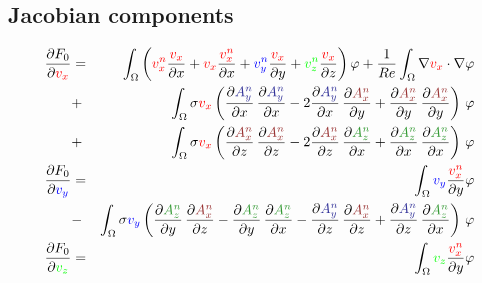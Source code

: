 \documentclass[smallextended]{svjour3}       %
\begin{document}
		\subsection{Jacobian components}
		\begin{eqnarray}
		\frac{\partial F_0}{\partial \textcolor{red}{v_x}} & = &
		\int_{\Omega} \left(\textcolor{red}{v_x^n} \frac{\textcolor{red}{v_x}}{\partial x} + \textcolor{red}{v_x} \frac{\textcolor{red}{v_x^n}}{\partial x} + \textcolor{blue}{v_y^n} \frac{\textcolor{red}{v_x}}{\partial y} + \textcolor{green}{v_z^n} \frac{\textcolor{red}{v_x}}{\partial z}\right) \varphi
			+ \frac{1}{Re} \int_{\Omega} \nabla \textcolor{red}{v_x} \cdot \nabla \varphi \nonumber \\
			& + & \int_{\Omega} \sigma \textcolor{red}{v_x} \left(\frac{\partial \textcolor{darkBlue}{A_y^n}}{\partial x}\,\frac{\partial \textcolor{darkBlue}{A_y^n}}{\partial x} - 2 \frac{\partial \textcolor{darkBlue}{A_y^n}}{\partial x}\,\frac{\partial \textcolor{darkRed}{A_x^n}}{\partial y} + \frac{\partial \textcolor{darkRed}{A_x^n}}{\partial y}\,\frac{\partial \textcolor{darkRed}{A_x^n}}{\partial y} \right)\, \varphi \nonumber \\				
			& + & \int_{\Omega} \sigma \textcolor{red}{v_x} \left(\frac{\partial \textcolor{darkRed}{A_x^n}}{\partial z}\,\frac{\partial \textcolor{darkRed}{A_x^n}}{\partial z} - 2 \frac{\partial \textcolor{darkRed}{A_x^n}}{\partial z}\,\frac{\partial \textcolor{darkGreen}{A_z^n}}{\partial x} + \frac{\partial \textcolor{darkGreen}{A_z^n}}{\partial x}\,\frac{\partial \textcolor{darkGreen}{A_z^n}}{\partial x} \right)\, \varphi \\
			\frac{\partial F_0}{\partial \textcolor{blue}{v_y}} & = &
		\int_{\Omega} \textcolor{blue}{v_y} \frac{\textcolor{red}{v_x^n}}{\partial y} \varphi \nonumber  \\		
			& - & \int_{\Omega} \sigma \textcolor{blue}{v_y} \left(\frac{\partial \textcolor{darkGreen}{A_z^n}}{\partial y}\,\frac{\partial \textcolor{darkRed}{A_x^n}}{\partial z} - \frac{\partial \textcolor{darkGreen}{A_z^n}}{\partial y}\,\frac{\partial \textcolor{darkGreen}{A_z^n}}{\partial x} - \frac{\partial \textcolor{darkBlue}{A_y^n}}{\partial z}\,\frac{\partial \textcolor{darkRed}{A_x^n}}{\partial z}  + \frac{\partial \textcolor{darkBlue}{A_y^n}}{\partial z}\,\frac{\partial \textcolor{darkGreen}{A_z^n}}{\partial x} \right)\, \varphi \\			
			\frac{\partial F_0}{\partial \textcolor{green}{v_z}} & = &
		\int_{\Omega} \textcolor{green}{v_z} \frac{\textcolor{red}{v_x^n}}{\partial y} \varphi

\end{eqnarray}
\end{document}
